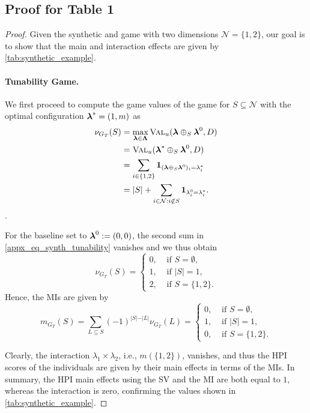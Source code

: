 \documentclass[letterpaper]{article} %
\begin{document}
\subsection{Proof for Table 1}
\begin{proof}
    Given the synthetic \dstunability and \sensitivity game with two dimensions $\mathcal N = \{1,2\}$, our goal is to show that the main and interaction effects are given by \cref{tab:synthetic_example}.

    \paragraph{Tunability Game.}
    We first proceed to compute the game values of the \dstunability game for $S \subseteq \mathcal N$ with the optimal configuration $\boldsymbol{\lambda}^\ast = (1,m)$ as
    \begin{align}\label{appx_eq_synth_tunability}
    \nu_{G_T}(S) &= \max_{\boldsymbol{\lambda} \in \boldsymbol{\Lambda}}\textsc{Val}_u(\boldsymbol{\lambda} \oplus_S \boldsymbol{\lambda}^0, D)\\ 
    &= \textsc{Val}_u(\boldsymbol{\lambda}^* \oplus_S \boldsymbol{\lambda}^0, D)\\
    &= \sum_{i \in \{1,2\}} \mathbf{1}_{(\boldsymbol{\lambda} \oplus_S \boldsymbol{\lambda}^0)_i = \lambda^\ast_i} \\
    &= \vert S \vert + \sum_{i \in \mathcal N: i \notin S} \mathbf{1}_{\lambda^0_i = \lambda^\ast_i}.
    \end{align}.


For the baseline set to $\boldsymbol{\lambda}^0 := (0,0)$, the second sum in \cref{appx_eq_synth_tunability} vanishes and we thus obtain
\[
    \nu_{G_T}(S) = \begin{cases}
        0, &\text{ if } S = \emptyset, \\
        1, &\text{ if } \vert S \vert = 1, \\
        2, &\text{ if } S=\{1,2\}.
    \end{cases}
\]
Hence, the \glspl*{MI} are given by
\[
    m_{G_T}(S) =\sum_{L \subseteq S}(-1)^{\vert S \vert - \vert L \vert} \nu_{G_T}(L) = \begin{cases}
        0, &\text{ if } S = \emptyset, \\
        1, &\text{ if } \vert S \vert = 1, \\
        0, &\text{ if } S=\{1,2\}.
    \end{cases}
\]

Clearly, the interaction $\lambda_1 \times \lambda_2$, i.e., $m(\{1,2\})$, vanishes, and thus the HPI scores of the individuals are given by their main effects in terms of the \glspl*{MI}.
In summary, the HPI main effects using the \gls*{SV} and the \gls*{MI} are both equal to $1$, whereas the interaction is zero, confirming the values shown in \cref{tab:synthetic_example}.


\end{proof}
\end{document}
